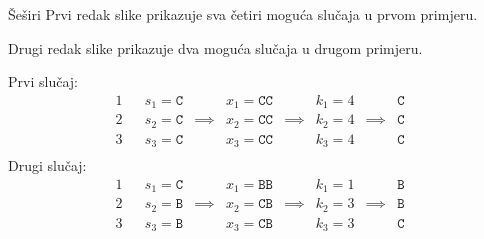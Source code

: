\begin{statement}[
  problempoints=100,
  timelimit=3 sekunde,
  memorylimit=512 MiB,
]{Šeširi}
Prvi redak slike prikazuje sva četiri moguća slučaja u prvom primjeru.

Drugi redak slike prikazuje dva moguća slučaja u drugom primjeru.

Prvi slučaj:
$$
\begin{array}{lccccccccc}
    1 & & s_1 = \texttt{C} &          & x_1 = \texttt{CC} &          & k_1 = 4 &          & \texttt{C} \\
    2 & & s_2 = \texttt{C} & \implies & x_2 = \texttt{CC} & \implies & k_2 = 4 & \implies & \texttt{C} \\
    3 & & s_3 = \texttt{C} &          & x_3 = \texttt{CC} &          & k_3 = 4 &          & \texttt{C} \\
\end{array}
$$
Drugi slučaj:
$$
\begin{array}{lccccccccc}
    1 & & s_1 = \texttt{C} &          & x_1 = \texttt{BB} &          & k_1 = 1 &          & \texttt{B} \\
    2 & & s_2 = \texttt{B} & \implies & x_2 = \texttt{CB} & \implies & k_2 = 3 & \implies & \texttt{B} \\
    3 & & s_3 = \texttt{B} &          & x_3 = \texttt{CB} &          & k_3 = 3 &          & \texttt{C} \\
\end{array}
$$


\end{statement}

